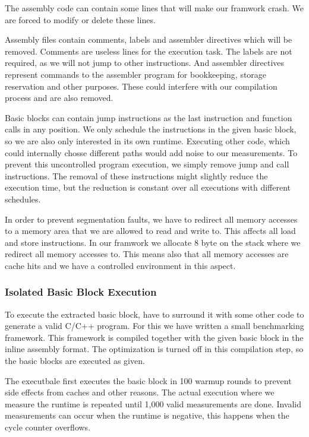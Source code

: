 The assembly code can contain some lines that will make our framwork crash.
We are forced to modify or delete these lines.

Assembly files contain comments, labels and assembler directives which will be removed.
Comments are useless lines for the execution task. 
The labels are not required, as we will not jump to other instructions.
And assembler directives represent commands to the assembler program for bookkeeping, storage reservation and other purposes.
These could interfere with our compilation process and are also removed.

Basic blocks can contain jump instructions as the last instruction and function calls in any position.
We only schedule the instructions in the given basic block, so we are also only interested in its own runtime.
Executing other code, which could internally chosse different paths would add noise to our measurements.
To prevent this uncontrolled program execution, we simply remove jump and call instructions.
The removal of these instructions might slightly reduce the execution time, but the reduction is constant over all executions with different schedules.

In order to prevent segmentation faults, we have to redirect all memory accesses to a memory area that we are allowed to read and write to.
This affects all load and store instructions.
In our framwork we allocate 8 byte on the stack where we redirect all memory accesses to.
This means also that all memory accesses are cache hits and we have a controlled environment in this aspect.


\subsubsection{Isolated Basic Block Execution}
\label{sec:approach:isol_bb_exec}
\tobechecked
To execute the extracted basic block, have to surround it with some other code to generate a valid C/C++ program.
For this we have written a small benchmarking framework.
This framework is compiled together with the given basic block in the inline assembly format.
The optimization is turned off in this compilation step, so the basic blocks are executed as given.

The executbale first executes the basic block in 100 warmup rounds to prevent side effects from caches and other reasons.
The actual execution where we measure the runtime is repeated until 1,000 valid measurements are done.
Invalid measurements can occur when the runtime is negative, this happens when the cycle counter overflows.

